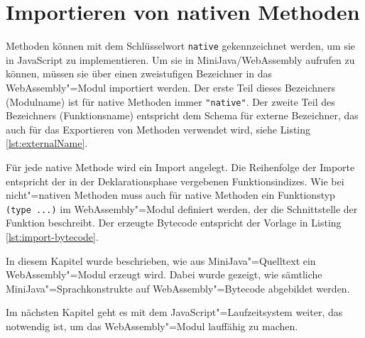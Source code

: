 \section{Importieren von nativen Methoden}

Methoden können mit dem Schlüsselwort \lstinline{native} gekennzeichnet werden, um sie in JavaScript zu implementieren. Um sie in MiniJava/WebAssembly aufrufen zu können, müssen sie über einen zweistufigen Bezeichner in das WebAssembly"=Modul importiert werden. Der erste Teil dieses Bezeichners (Modulname) ist für native Methoden immer \lstinline{"native"}. Der zweite Teil des Bezeichners (Funktionsname) entspricht dem Schema für externe Bezeichner, das auch für das Exportieren von Methoden verwendet wird, siehe Listing \ref{lst:externalName}.

\pagebreak
Für jede native Methode wird ein Import angelegt. Die Reihenfolge der Importe entspricht der in der Deklarationsphase vergebenen Funktionsindizes. Wie bei nicht"=nativen Methoden muss auch für native Methoden ein Funktionstyp \lstinline{(type ...)} im WebAssembly"=Modul definiert werden, der die Schnittstelle der Funktion beschreibt. Der erzeugte Bytecode entspricht der Vorlage in Listing \ref{lst:import-bytecode}.



\vspace{4em}
In diesem Kapitel wurde beschrieben, wie aus MiniJava"=Quelltext ein WebAssembly"=Modul erzeugt wird. Dabei wurde gezeigt, wie sämtliche MiniJava"=Sprachkonstrukte auf WebAssembly"=Bytecode abgebildet werden.

Im nächsten Kapitel geht es mit dem JavaScript"=Laufzeitsystem weiter, das notwendig ist, um das WebAssembly"=Modul lauffähig zu machen.
